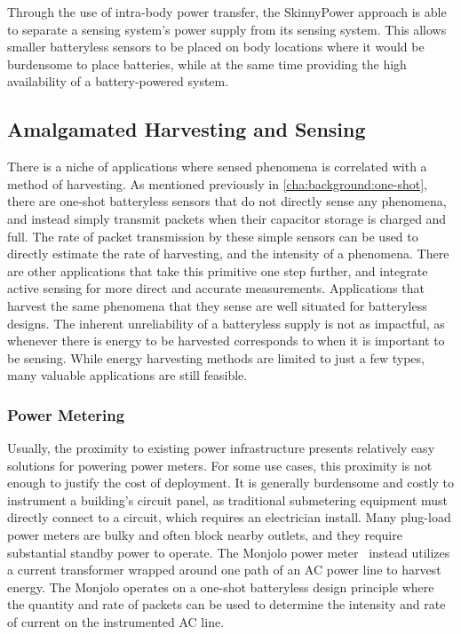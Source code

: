 Through the use of intra-body power transfer, the SkinnyPower approach is able to separate a sensing system's power supply from its sensing system. This allows smaller batteryless sensors to be placed on body locations where it would be burdensome to place batteries, while at the same time providing the high availability of a battery-powered system.

\subsection{Amalgamated Harvesting and Sensing}
There is a niche of applications where sensed phenomena is correlated with a method of harvesting.
As mentioned previously in \cref{cha:background:one-shot}, there are one-shot batteryless sensors that do not directly sense any phenomena, and instead simply transmit packets when their capacitor storage is charged and full.
The rate of packet transmission by these simple sensors can be used to directly estimate the rate of harvesting, and the intensity of a phenomena.
There are other applications that take this primitive one step further, and integrate active sensing for more direct and accurate measurements.
Applications that harvest the same phenomena that they sense are well situated for batteryless designs.
The inherent unreliability of a batteryless supply is not as impactful, as whenever there is energy to be harvested corresponds to when it is important to be sensing.
While energy harvesting methods are limited to just a few types, many valuable applications are still feasible.

\subsubsection{Power Metering}
Usually, the proximity to existing power infrastructure presents relatively easy solutions for powering power meters.
For some use cases, this proximity is not enough to justify the cost of deployment.
It is generally burdensome and costly to instrument a building's circuit panel, as traditional submetering equipment must directly connect to a circuit, which requires an electrician install.
Many plug-load power meters are bulky and often block nearby outlets, and they require substantial standby power to operate.
The Monjolo power meter~\cite{debruin2013monjolo} instead utilizes a current transformer wrapped around one path of an AC power line to harvest energy.
The Monjolo operates on a one-shot batteryless design principle where the quantity and rate of packets can be used to determine the intensity and rate of current on the instrumented AC line.

